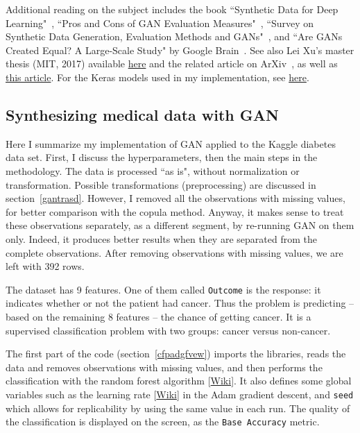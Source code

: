 \documentclass[oneside,10pt]{book}
\begin{document}
Additional reading on the subject includes the book ``Synthetic Data for Deep Learning"~\cite{sddl21},
``Pros and Cons of GAN Evaluation Measures"~\cite{procons21}, 
``Survey on Synthetic Data Generation, Evaluation Methods and GANs"~\cite{gan18pobt},
and ``Are GANs Created Equal? A Large-Scale Study" by Google Brain~\cite{gbrain18}. 
See also Lei Xu's master thesis (MIT, 2017) available
 \href{https://dai.lids.mit.edu/wp-content/uploads/2020/02/Lei_SMThesis_neo.pdf}{here}
 and the related article on ArXiv~\cite{lw18}, 
 as well as \href{https://www.maskaravivek.com/post/ctgan-tabular-synthetic-data-generation/}{this article}.
 For the Keras models used in my implementation, see \href{https://www.activestate.com/resources/quick-reads/what-is-a-keras-model/}{here}.

\subsection{Synthesizing medical data with GAN}

Here I summarize my implementation of GAN applied to the Kaggle diabetes data set. First, I discuss the
\textcolor{index}{hyperparameters}, then the main steps in the methodology. The
 data is processed ``as is", without normalization or transformation. Possible transformations (preprocessing) are discussed in
section~\ref{gantrasd}. However, I removed all the observations with missing values, for better comparison with the copula method.
 Anyway, it makes sense to treat these observations separately, as a different segment, by re-running GAN on them only. Indeed, it produces better results when they are separated from the complete observations. After removing observations with missing values, we are left with 392 rows.

The dataset has 9 features. One of them called \texttt{Outcome} is the response: it indicates whether or not the patient had cancer. Thus the problem is predicting -- based on the remaining 8 features -- the chance of getting cancer. It is a supervised classification problem with two groups:
 cancer versus non-cancer. 

The first part of the code (section~\ref{cfpadgfvew}) imports the libraries, reads the data and removes observations with missing values, and then 
performs the classification with the \textcolor{index}{random forest} algorithm [\href{https://en.wikipedia.org/wiki/Random_forest}{Wiki}]. 
It also defines some global variables such as the \textcolor{index}{learning rate} [\href{https://en.wikipedia.org/wiki/Learning_rate}{Wiki}] in the Adam gradient descent, and \textcolor{index}{\texttt{seed}} which allows for replicability by using the same value in each run. 
 The quality of the classification is displayed on the screen, as the \texttt{Base Accuracy} metric. 
\end{document}
